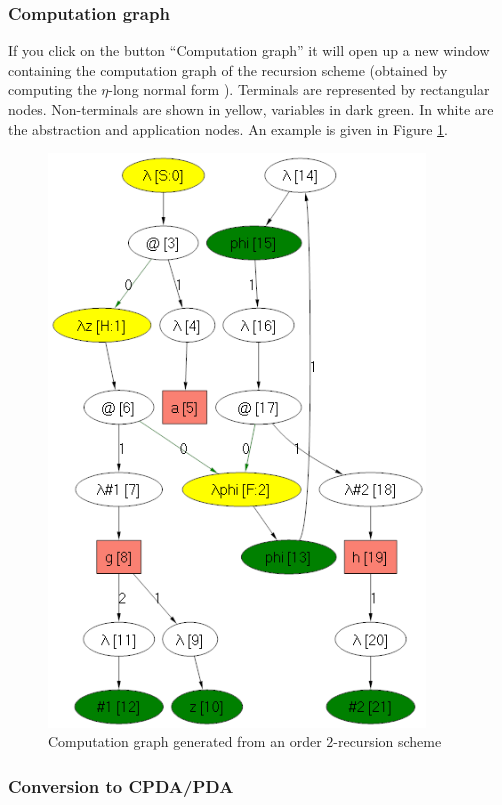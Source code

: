 \documentclass{article}
\begin{document}
\subsubsection{Computation graph}

If you click on the button ``Computation graph'' it will open up a new window containing the computation graph of the recursion scheme (obtained by computing the $\eta$-long normal form \cite{OngLics2006}).
Terminals are represented by rectangular nodes.
Non-terminals are shown in yellow, variables in dark green. In white
are the abstraction and application nodes. An example is given in Figure \ref{fig:compgraph}.

\begin{figure}[htbp]
  \begin{center}
  \includegraphics[width=10cm]{compgraph}
  \end{center}
  \caption{Computation graph generated from an order $2$-recursion scheme}\label{fig:compgraph}
\end{figure}


\subsubsection{Conversion to CPDA/PDA}
\end{document}
